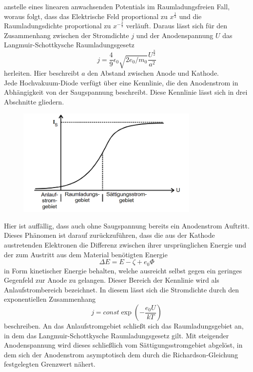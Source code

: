 anstelle eines linearen anwachsenden Potentials im Raumladungsfreien Fall, woraus folgt, dass das Elektrische Feld proportional zu $x^{\frac{1}{3}}$
und die Raumladungsdichte proportional zu $x^{-\frac{2}{3}}$ verläuft. Daraus lässt sich für den Zusammenhang zwischen der Stromdichte $j$ 
und der Anodenspannung $U$ das Langmuir-Schottkysche Raumladungsgesetz 
\begin{equation}
j=\frac{4}{9}\epsilon_0\sqrt{2e_0/m_0}\frac{U^{\frac{3}{2}}}{a^2}
\end{equation}
herleiten. Hier beschreibt $a$ den Abstand zwischen Anode und Kathode. \\
Jede Hochvakuum-Diode verfügt über eine Kennlinie, die den Anodenstrom in Abhängigkeit von der Saugspannung beschreibt. Diese Kennlinie lässt 
sich in drei Abschnitte gliedern.
\begin{figure}[h]
    \centering
    \includegraphics[width=9cm, keepaspectratio]{Kennlinie}
  \end{figure}
Hier ist auffällig, dass auch ohne Saugspannung bereits ein Anodenstrom Auftritt. Dieses Phänomen ist darauf zurückzuführen, 
dass die aus der Kathode austretenden Elektronen die Differenz zwischen ihrer ursprünglichen Energie und der zum Austritt aus dem Material benötigten Energie
\begin{equation}
\Delta E=E-\zeta+e_0\Phi
\end{equation}
in Form kinetischer Energie behalten, welche ausreicht selbst gegen ein geringes Gegenfeld zur Anode zu gelangen. Dieser Bereich der Kennlinie wird als
Anlaufstrombereich bezeichnet. In diesem lässt sich die Stromdichte durch den exponentiellen Zusammenhang
\begin{equation}
j=const\exp(-\frac{e_0U}{kT})
\end{equation}
beschreiben. An das Anlaufstromgebiet schließt sich das Raumladungsgebiet an, in dem das Langmuir-Schottkysche Raumladungsgesetz gilt. Mit steigender
Anodenspannung wird dieses schließlich vom Sättigungsstromgebiet abgelöst, in dem sich der Anodenstrom asymptotisch dem durch die Richardson-Gleichung
festgelegten Grenzwert nähert.


